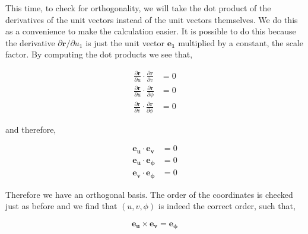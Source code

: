 \documentclass[11pt]{amsart}
\begin{document}
This time, to check for orthogonality, we will take the dot product of the derivatives of the unit vectors instead of the unit vectors themselves. We do this as a convenience to make the calculation easier. It is possible to do this because the derivative $\partial \mathbf{r} / \partial u_1$ is just the unit vector $\mathbf{e_1}$ multiplied by a constant, the scale factor. By computing the dot products we see that,

\begin{align*}
  \frac{\partial\mathbf{r}}{\partial u}\cdot\frac{\partial\mathbf{r}}{\partial v} &= 0 \\
  \frac{\partial\mathbf{r}}{\partial u}\cdot\frac{\partial\mathbf{r}}{\partial \phi} &= 0 \\
  \frac{\partial\mathbf{r}}{\partial v}\cdot\frac{\partial\mathbf{r}}{\partial \phi} &= 0
\end{align*}

and therefore,

\begin{align*}
  \mathbf{e_u}\cdot\mathbf{e_v} &= 0 \\
  \mathbf{e_u}\cdot\mathbf{e_{\phi}} &= 0 \\
  \mathbf{e_v}\cdot\mathbf{e_{\phi}} &= 0
\end{align*}

Therefore we have an orthogonal basis. The order of the coordinates is checked just as before and we find that $(u, v, \phi)$ is indeed the correct order, such that,

\begin{align*}
  \mathbf{e_u}\times\mathbf{e_v}=\mathbf{e_{\phi}}
\end{align*}
\end{document}
